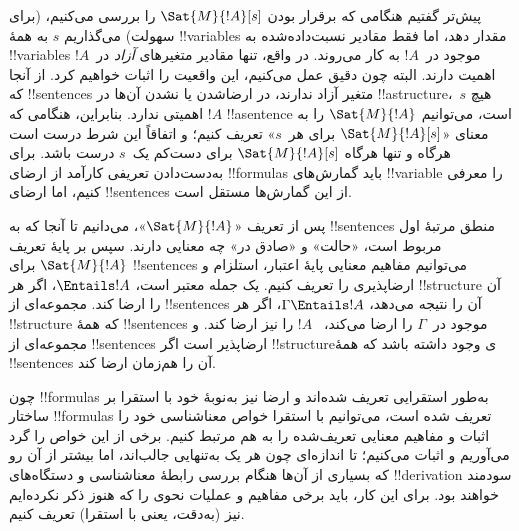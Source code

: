 \documentclass[../../../include/open-logic-section]{subfiles}
\begin{document}


پیش‌تر گفتیم هنگامی که برقرار بودن $\Sat{M}{!A}[s]$ را بررسی می‌کنیم،
(برای سهولت) می‌گذاریم $s$ به همهٔ !!{variable}s مقدار دهد، اما فقط
مقادیر نسبت‌داده‌شده به !!{variable}s موجود در~$!A$ به کار می‌روند. در
واقع، تنها مقادیر متغیرهای \emph{آزاد} در~$!A$ اهمیت دارند. البته چون
دقیق عمل می‌کنیم، این واقعیت را اثبات خواهیم کرد. از آنجا که
!!{sentence}s متغیر آزاد ندارند، در ارضاشدن یا نشدن آن‌ها در
!!a{structure}،~$s$ هیچ اهمیتی ندارد. بنابراین، هنگامی که $!A$
!!a{sentence} است، می‌توانیم $\Sat{M}{!A}$ را به معنای
«$\Sat{M}{!A}[s]$ برای هر~$s$» تعریف کنیم؛ و اتفاقاً این شرط درست است
هرگاه و تنها هرگاه $\Sat{M}{!A}[s]$ برای دست‌کم یک~$s$ درست باشد. برای
به‌دست‌دادن تعریفی کارآمد از ارضای !!{formula}s باید گمارش‌های
!!{variable} را معرفی کنیم، اما ارضای !!{sentence}s از این گمارش‌ها
مستقل است.

پس از تعریف «$\Sat{M}{!A}$»، می‌دانیم تا آنجا که به !!{sentence}s
منطق مرتبهٔ اول مربوط است، «حالت» و «صادق در» چه معنایی دارند. سپس بر
پایهٔ تعریف $\Sat{M}{!A}$ برای !!{sentence}s می‌توانیم مفاهیم معنایی
پایهٔ اعتبار، استلزام و ارضاپذیری را تعریف کنیم. یک جمله معتبر است،
$\Entails !A$، اگر هر !!{structure} آن را ارضا کند. مجموعه‌ای از
!!{sentence}s آن را نتیجه می‌دهد، $\Gamma \Entails !A$، اگر هر
!!{structure} که همهٔ !!{sentence}s موجود در~$\Gamma$ را ارضا می‌کند،
~$!A$ را نیز ارضا کند. و مجموعه‌ای از !!{sentence}s ارضاپذیر است اگر
!!{structure}ی وجود داشته باشد که همهٔ !!{sentence}s آن را هم‌زمان
ارضا کند.

چون !!{formula}s به‌طور استقرایی تعریف شده‌اند و ارضا نیز به‌نوبهٔ خود
با استقرا بر ساختار !!{formula}s تعریف شده است، می‌توانیم با استقرا
خواص معناشناسی خود را اثبات و مفاهیم معنایی تعریف‌شده را به هم مرتبط
کنیم. برخی از این خواص را گرد می‌آوریم و اثبات می‌کنیم؛ تا اندازه‌ای
چون هر یک به‌تنهایی جالب‌اند، اما بیشتر از آن رو که بسیاری از آن‌ها
هنگام بررسی رابطهٔ معناشناسی و دستگاه‌های !!{derivation} سودمند خواهند
بود. برای این کار، باید برخی مفاهیم و عملیات نحوی را که هنوز ذکر
نکرده‌ایم نیز (به‌دقت، یعنی با استقرا) تعریف کنیم.
\end{document}
